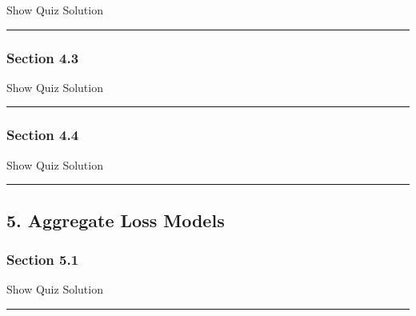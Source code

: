 \documentclass[]{article}
\begin{document}
\hypertarget{surveyResult42}{}

Show Quiz Solution

\hypertarget{display.Quiz42.2}{}
\begin{center}\rule{0.5\linewidth}{\linethickness}\end{center}

\subsubsection{Section 4.3}\label{section-4.3}

\hypertarget{surveyElement43}{}

\hypertarget{surveyResult43}{}

Show Quiz Solution

\hypertarget{display.Quiz43.2}{}
\begin{center}\rule{0.5\linewidth}{\linethickness}\end{center}

\subsubsection{Section 4.4}\label{section-4.4}

\hypertarget{surveyElement44}{}

\hypertarget{surveyResult44}{}

Show Quiz Solution

\hypertarget{display.Quiz44.2}{}
\begin{center}\rule{0.5\linewidth}{\linethickness}\end{center}

\subsection{5. Aggregate Loss Models}\label{aggregate-loss-models}

\subsubsection{Section 5.1}\label{section-5.1}

\hypertarget{surveyElement51}{}

\hypertarget{surveyResult51}{}

Show Quiz Solution

\hypertarget{display.Quiz51.2}{}
\begin{center}\rule{0.5\linewidth}{\linethickness}\end{center}
\end{document}
